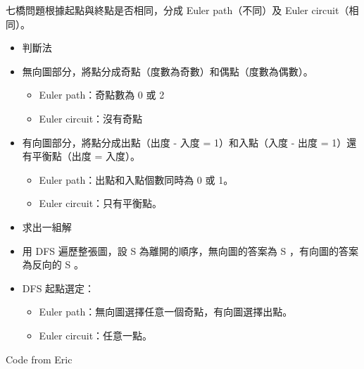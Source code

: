 七橋問題根據起點與終點是否相同，分成 Euler path（不同）及 Euler circuit（相同）。

\begin{itemize}
    \item 判斷法
    \item 無向圖部分，將點分成奇點（度數為奇數）和偶點（度數為偶數）。
    \begin{itemize}
        \item Euler path：奇點數為 0 或 2
        \item Euler circuit：沒有奇點
    \end{itemize}
    \item 有向圖部分，將點分成出點（出度 - 入度 = 1）和入點（入度 - 出度 = 1）還有平衡點（出度 = 入度）。
    \begin{itemize}
        \item Euler path：出點和入點個數同時為 0 或 1。
        \item Euler circuit：只有平衡點。
    \end{itemize}
    \item 求出一組解
    \item 用 DFS 遍歷整張圖，設 S 為離開的順序，無向圖的答案為 S ，有向圖的答案為反向的 S 。
    \item DFS 起點選定：
    \begin{itemize}
        \item Euler path：無向圖選擇任意一個奇點，有向圖選擇出點。
        \item Euler circuit：任意一點。
    \end{itemize}
\end{itemize}

Code from Eric

